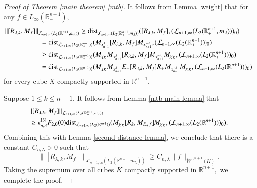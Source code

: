 \documentclass[12pt]{amsart}
\begin{document}
\begin{proof}[Proof of Theorem \ref{main theorem} \eqref{mtb}] It follows from Lemma \ref{weight} that for any $f\in L_{\infty}(\mathbb{R}^{n+1}_+),$
\begin{align*}
\|[R_{\lambda,k},M_f]\|_{\mathcal{L}_{n+1,\infty}(L_2(\mathbb{R}^{n+1}_+,m_{\lambda}))}&\geq {\rm dist}_{\mathcal{L}_{n+1,\infty}(L_2(\mathbb{R}^{n+1}_+,m_{\lambda}))}([R_{\lambda,k},M_f],(\mathcal{L}_{n+1,\infty}(L_2(\mathbb{R}^{n+1}_+,m_{\lambda})))_0)\\
&\hspace{-2.0cm}={\rm dist}_{\mathcal{L}_{n+1,\infty}(L_2(\mathbb{R}^{n+1}_+))}(M_{x_{n+1}^{\lambda}}[R_{\lambda,k},M_f]M_{x_{n+1}^{-\lambda}},(\mathcal{L}_{n+1,\infty}(L_2(\mathbb{R}^{n+1}_+)))_0)\\
&\hspace{-2.0cm}\geq {\rm dist}_{\mathcal{L}_{n+1,\infty}(L_2(\mathbb{R}^{n+1}_+))}(M_{\chi_K} M_{x_{n+1}^{\lambda}}[R_{\lambda,k},M_f]M_{x_{n+1}^{-\lambda}} M_{\chi_K},(\mathcal{L}_{n+1,\infty}(L_2(\mathbb{R}^{n+1}_+)))_0)\\
&\hspace{-2.0cm}={\rm dist}_{\mathcal{L}_{n+1,\infty}(L_2(\mathbb{R}^{n+1}))}(M_{\chi_K} M_{x_{n+1}^{\lambda}}E_+[R_{\lambda,k},M_f]R_+M_{x_{n+1}^{-\lambda}} M_{\chi_K},(\mathcal{L}_{n+1,\infty}(L_2(\mathbb{R}^{n+1})))_0)
\end{align*}
for every cube $K$ compactly supported in $\mathbb{R}^{n+1}_+.$	

Suppose $1\leq k\leq n+1.$ It follows from Lemma \ref{mtb main lemma} that
\begin{align*}
&\|[R_{\lambda,k},M_f]\|_{\mathcal{L}_{n+1,\infty}(L_2(\mathbb{R}^{n+1}_+,m_{\lambda}))}\\
&\geq \kappa^{[3]}_{n,\lambda}F_{2,0}(0){\rm dist}_{\mathcal{L}_{n+1,\infty}(L_2(\mathbb{R}^{n+1}))}(M_{\chi_K} [R_k,M_{E_+f}] M_{\chi_K},(\mathcal{L}_{n+1,\infty}(L_2(\mathbb{R}^{n+1})))_0).
\end{align*}
Combining this with Lemma \ref{second distance lemma}, we conclude that there is a constant $C_{n,\lambda}>0$ such that
$$\|[R_{\lambda,k},M_f]\|_{\mathcal{L}_{n+1,\infty}(L_2(\mathbb{R}^{n+1}_+,m_{\lambda}))}\geq C_{n,\lambda} \|f\|_{\dot{W}^{1,n+1}(K)}.$$
Taking the supremum over all cubes $K$ compactly supported in $\mathbb{R}^{n+1}_+,$ we complete the proof.	
\end{proof}
\end{document}
